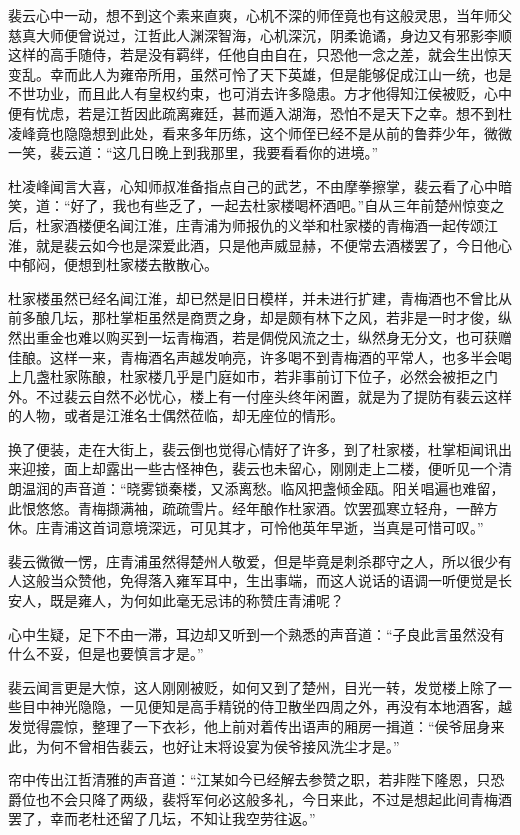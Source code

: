 裴云心中一动，想不到这个素来直爽，心机不深的师侄竟也有这般灵思，当年师父慈真大师便曾说过，江哲此人渊深智海，心机深沉，阴柔诡谲，身边又有邪影李顺这样的高手随侍，若是没有羁绊，任他自由自在，只恐他一念之差，就会生出惊天变乱。幸而此人为雍帝所用，虽然可怜了天下英雄，但是能够促成江山一统，也是不世功业，而且此人有皇权约束，也可消去许多隐患。方才他得知江侯被贬，心中便有忧虑，若是江哲因此疏离雍廷，甚而遁入湖海，恐怕不是天下之幸。想不到杜凌峰竟也隐隐想到此处，看来多年历练，这个师侄已经不是从前的鲁莽少年，微微一笑，裴云道：“这几日晚上到我那里，我要看看你的进境。”

杜凌峰闻言大喜，心知师叔准备指点自己的武艺，不由摩拳擦掌，裴云看了心中暗笑，道：“好了，我也有些乏了，一起去杜家楼喝杯酒吧。”自从三年前楚州惊变之后，杜家酒楼便名闻江淮，庄青浦为师报仇的义举和杜家楼的青梅酒一起传颂江淮，就是裴云如今也是深爱此酒，只是他声威显赫，不便常去酒楼罢了，今日他心中郁闷，便想到杜家楼去散散心。

杜家楼虽然已经名闻江淮，却已然是旧日模样，并未进行扩建，青梅酒也不曾比从前多酿几坛，那杜掌柜虽然是商贾之身，却是颇有林下之风，若非是一时才俊，纵然出重金也难以购买到一坛青梅酒，若是倜傥风流之士，纵然身无分文，也可获赠佳酿。这样一来，青梅酒名声越发响亮，许多喝不到青梅酒的平常人，也多半会喝上几盏杜家陈酿，杜家楼几乎是门庭如市，若非事前订下位子，必然会被拒之门外。不过裴云自然不必忧心，楼上有一付座头终年闲置，就是为了提防有裴云这样的人物，或者是江淮名士偶然莅临，却无座位的情形。

换了便装，走在大街上，裴云倒也觉得心情好了许多，到了杜家楼，杜掌柜闻讯出来迎接，面上却露出一些古怪神色，裴云也未留心，刚刚走上二楼，便听见一个清朗温润的声音道：“晓雾锁秦楼，又添离愁。临风把盏倾金瓯。阳关唱遍也难留，此恨悠悠。青梅撷满袖，疏疏雪片。经年酿作杜家酒。饮罢孤寒立轻舟，一醉方休。庄青浦这首词意境深远，可见其才，可怜他英年早逝，当真是可惜可叹。”

裴云微微一愣，庄青浦虽然得楚州人敬爱，但是毕竟是刺杀郡守之人，所以很少有人这般当众赞他，免得落入雍军耳中，生出事端，而这人说话的语调一听便觉是长安人，既是雍人，为何如此毫无忌讳的称赞庄青浦呢？

心中生疑，足下不由一滞，耳边却又听到一个熟悉的声音道：“子良此言虽然没有什么不妥，但是也要慎言才是。”

裴云闻言更是大惊，这人刚刚被贬，如何又到了楚州，目光一转，发觉楼上除了一些目中神光隐隐，一见便知是高手精锐的侍卫散坐四周之外，再没有本地酒客，越发觉得震惊，整理了一下衣衫，他上前对着传出语声的厢房一揖道：“侯爷屈身来此，为何不曾相告裴云，也好让末将设宴为侯爷接风洗尘才是。”

帘中传出江哲清雅的声音道：“江某如今已经解去参赞之职，若非陛下隆恩，只恐爵位也不会只降了两级，裴将军何必这般多礼，今日来此，不过是想起此间青梅酒罢了，幸而老杜还留了几坛，不知让我空劳往返。”

